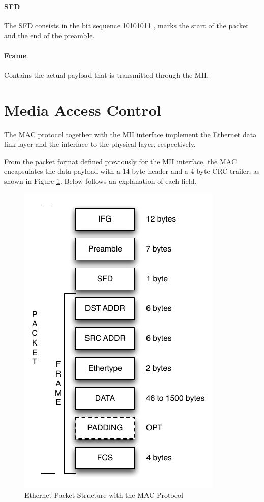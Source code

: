 \documentclass[defaultstyle,10pt,master,Helvetica]{thesis}
\begin{document}
\paragraph*{SFD} The \ac{SFD} consists in the bit sequence 10101011 \footnotemark[\value{footnote}], marks the start of the packet and the end of the preamble.

\paragraph*{Frame} Contains the actual payload that is transmitted through the MII.

\section{Media Access Control}

The \acf{MAC}\cite{ieee802.3a} protocol together with the \ac{MII} interface implement the Ethernet data link layer and the interface to the physical layer, respectively.

From the packet format defined previously for the \ac{MII} interface, the \ac{MAC} encapsulates the data payload with a 14-byte header and a 4-byte \ac{CRC} trailer, as shown in Figure \ref{fig:Eth-frame}. Below follows an explanation of each field.

\begin{figure}[h]
  \centering
      \includegraphics[scale=1.00,center]{Diagrams/MAC-FRAME.pdf}
  \caption{Ethernet Packet Structure with the \ac{MAC} Protocol}\label{fig:Eth-frame}
\end{figure}
\end{document}
